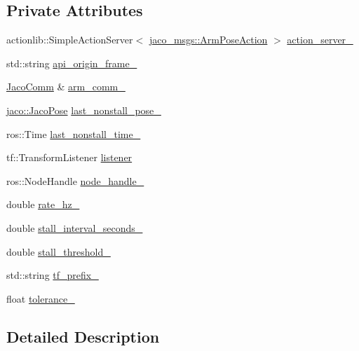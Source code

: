 \subsection*{Private Attributes}
\begin{DoxyCompactItemize}
\item 
actionlib\+::\+Simple\+Action\+Server$<$ \hyperlink{namespacejaco__msgs_a4c602e87a73fa73e367226c6d5547ebd}{jaco\+\_\+msgs\+::\+Arm\+Pose\+Action} $>$ \hyperlink{classjaco_1_1JacoPoseActionServer_ac5ecd6a61bf824052ff744aad8bf886a}{action\+\_\+server\+\_\+}
\item 
std\+::string \hyperlink{classjaco_1_1JacoPoseActionServer_a5f90297e166e0113362ad14abc78f13f}{api\+\_\+origin\+\_\+frame\+\_\+}
\item 
\hyperlink{classjaco_1_1JacoComm}{Jaco\+Comm} \& \hyperlink{classjaco_1_1JacoPoseActionServer_ad849b8d5a2bb31a65ab24b586a86c9a1}{arm\+\_\+comm\+\_\+}
\item 
\hyperlink{classjaco_1_1JacoPose}{jaco\+::\+Jaco\+Pose} \hyperlink{classjaco_1_1JacoPoseActionServer_aa7e288732479301e6f63762f91b08580}{last\+\_\+nonstall\+\_\+pose\+\_\+}
\item 
ros\+::\+Time \hyperlink{classjaco_1_1JacoPoseActionServer_a6b5b38efebafd4426afd01368bcf6f87}{last\+\_\+nonstall\+\_\+time\+\_\+}
\item 
tf\+::\+Transform\+Listener \hyperlink{classjaco_1_1JacoPoseActionServer_a43c58cdc664caaa1471792c672aea7c1}{listener}
\item 
ros\+::\+Node\+Handle \hyperlink{classjaco_1_1JacoPoseActionServer_ae5c09c6924a4eeccd4d32ca59ed6465d}{node\+\_\+handle\+\_\+}
\item 
double \hyperlink{classjaco_1_1JacoPoseActionServer_a3512d3517f7d55ad0b481081a7000b06}{rate\+\_\+hz\+\_\+}
\item 
double \hyperlink{classjaco_1_1JacoPoseActionServer_a48c5866f584f192be487934d3fbf5ebc}{stall\+\_\+interval\+\_\+seconds\+\_\+}
\item 
double \hyperlink{classjaco_1_1JacoPoseActionServer_a71248453a7bb76ba012040b1b9d67924}{stall\+\_\+threshold\+\_\+}
\item 
std\+::string \hyperlink{classjaco_1_1JacoPoseActionServer_ae846600150f2139d117f9994bf19747f}{tf\+\_\+prefix\+\_\+}
\item 
float \hyperlink{classjaco_1_1JacoPoseActionServer_a086630400cbfd3e75414a620f8220038}{tolerance\+\_\+}
\end{DoxyCompactItemize}


\subsection{Detailed Description}


